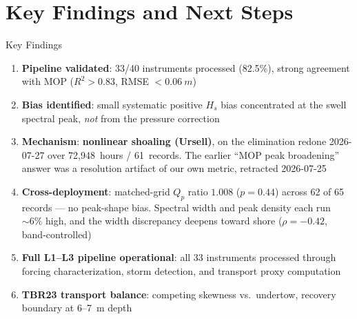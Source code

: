 \documentclass[10pt, aspectratio=169]{beamer}
\begin{document}
\section{Key Findings and Next Steps}

\begin{frame}{Key Findings}
  \begin{enumerate}
    \item \textbf{Pipeline validated}: 33/40 instruments processed
          (82.5\%), strong agreement with MOP
          ($R^2 > 0.83$, RMSE $< 0.06~m$)
    \item \textbf{Bias identified}: small systematic positive
          $H_s$ bias concentrated at the swell spectral peak,
          \emph{not} from the pressure correction
    \item \textbf{Mechanism}: \textbf{nonlinear shoaling (Ursell)},
          on the elimination redone 2026-07-27 over 72{,}948~hours /
          61~records. The earlier ``MOP peak broadening'' answer was a
          resolution artifact of our own metric, retracted 2026-07-25
    \item \textbf{Cross-deployment}: matched-grid $Q_p$ ratio $1.008$
          ($p = 0.44$) across 62 of 65 records --- no peak-shape bias.
          Spectral width and peak density each run ${\sim}6\%$ high,
          and the width discrepancy deepens toward shore
          ($\rho = -0.42$, band-controlled)
    \item \textbf{Full L1--L3 pipeline operational}: all 33 instruments
          processed through forcing characterization, storm detection,
          and transport proxy computation
    \item \textbf{TBR23 transport balance}: competing skewness
          vs.\ undertow, recovery boundary at 6--7~m depth
  \end{enumerate}
\end{frame}
\end{document}
